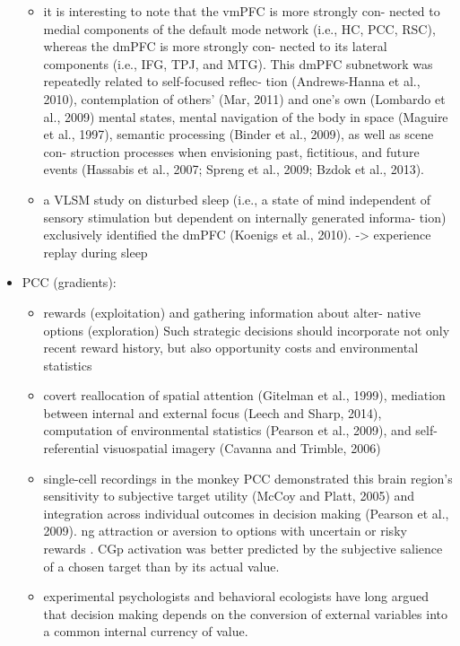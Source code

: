 \documentclass{article} %
\begin{document}
\begin{itemize}
\begin{itemize}
\item
it is interesting to note that the vmPFC is more strongly con- nected to medial components of the default mode network (i.e., HC, PCC, RSC), whereas the dmPFC is more strongly con- nected to its lateral components (i.e., IFG, TPJ, and MTG). This dmPFC subnetwork was repeatedly related to self-focused reflec- tion (Andrews-Hanna et al., 2010), contemplation of others’ (Mar, 2011) and one’s own (Lombardo et al., 2009) mental states, mental navigation of the body in space (Maguire et al., 1997), semantic processing (Binder et al., 2009), as well as scene con- struction processes when envisioning past, fictitious, and future events (Hassabis et al., 2007; Spreng et al., 2009; Bzdok et al., 2013).


\item
a VLSM study on disturbed sleep (i.e., a state of mind independent of sensory stimulation but dependent on internally generated informa- tion) exclusively identified the dmPFC (Koenigs et al., 2010).
-> experience replay during sleep

\end{itemize}

  \item
    PCC (gradients):
    \begin{itemize}
      \item rewards (exploitation) and gathering information about alter- native options (exploration)
Such strategic decisions should incorporate not only recent reward history, but also opportunity costs and environmental statistics

\item
covert reallocation of spatial attention (Gitelman et al., 1999), mediation between internal and external focus (Leech and Sharp, 2014), computation of environmental statistics (Pearson et al., 2009), and self-referential visuospatial imagery (Cavanna and Trimble, 2006)


\item
single-cell recordings in the monkey PCC demonstrated this brain region's sensitivity to subjective target utility (McCoy and Platt, 2005) and integration across individual outcomes in decision making (Pearson et al., 2009).
ng attraction or aversion to options with uncertain or risky rewards
. CGp activation was better predicted by the
subjective salience of a chosen target than by its actual value.

\item
experimental psychologists and behavioral ecologists
have long argued that decision making depends on the conversion
of external variables into a common internal currency of value.


\end{itemize}
\end{itemize}
\end{document}
